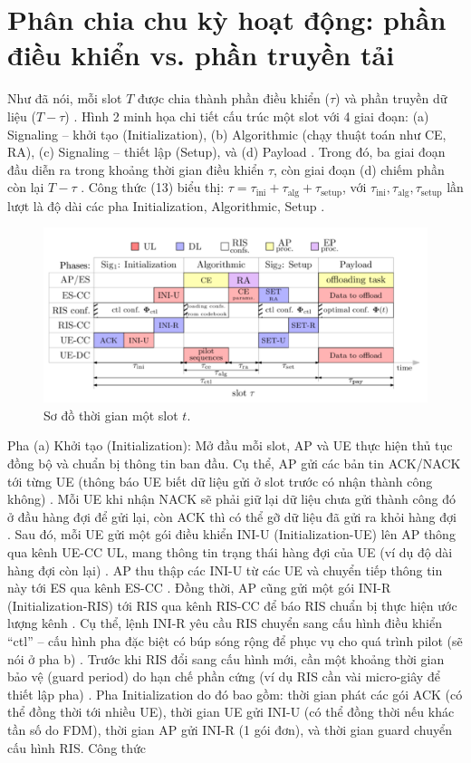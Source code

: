 \section{Phân chia chu kỳ hoạt động: phần điều khiển vs. phần truyền tải}

Như đã nói, mỗi slot $T$ được chia thành phần điều khiển ($\tau$) và phần truyền dữ liệu ($T-\tau$)
. Hình 2 minh họa chi tiết cấu trúc một slot với 4 giai đoạn: (a) Signaling – khởi tạo (Initialization), (b) Algorithmic (chạy thuật toán như CE, RA), (c) Signaling – thiết lập (Setup), và (d) Payload
\cite{ris_latency}
. Trong đó, ba giai đoạn đầu diễn ra trong khoảng thời gian điều khiển $\tau$, còn giai đoạn (d) chiếm phần còn lại $T-\tau$
. Công thức (13) biểu thị: $\tau = \tau_\text{ini} + \tau_\text{alg} + \tau_\text{setup}$, với $\tau_\text{ini}, \tau_\text{alg}, \tau_\text{setup}$ lần lượt là độ dài các pha Initialization, Algorithmic, Setup
.

\begin{figure}[H]
  \centering
  \includegraphics[width=1\textwidth]{images/f2.png}
  \caption{Sơ đồ thời gian một slot $t$. }
    \label{fig:my-image}
\end{figure}


Pha (a) Khởi tạo (Initialization): Mở đầu mỗi slot, AP và UE thực hiện thủ tục đồng bộ và chuẩn bị thông tin ban đầu. Cụ thể, AP gửi các bản tin ACK/NACK tới từng UE (thông báo UE biết dữ liệu gửi ở slot trước có nhận thành công không)
. Mỗi UE khi nhận NACK sẽ phải giữ lại dữ liệu chưa gửi thành công đó ở đầu hàng đợi để gửi lại, còn ACK thì có thể gỡ dữ liệu đã gửi ra khỏi hàng đợi
. Sau đó, mỗi UE gửi một gói điều khiển INI-U (Initialization-UE) lên AP thông qua kênh UE-CC UL, mang thông tin trạng thái hàng đợi của UE (ví dụ độ dài hàng đợi còn lại)
. AP thu thập các INI-U từ các UE và chuyển tiếp thông tin này tới ES qua kênh ES-CC
. Đồng thời, AP cũng gửi một gói INI-R (Initialization-RIS) tới RIS qua kênh RIS-CC để báo RIS chuẩn bị thực hiện ước lượng kênh
\cite{ris_latency}
. Cụ thể, lệnh INI-R yêu cầu RIS chuyển sang cấu hình điều khiển “ctl” – cấu hình pha đặc biệt có búp sóng rộng để phục vụ cho quá trình pilot (sẽ nói ở pha b)
. Trước khi RIS đổi sang cấu hình mới, cần một khoảng thời gian bảo vệ (guard period) do hạn chế phần cứng (ví dụ RIS cần vài micro-giây để thiết lập pha)
. Pha Initialization do đó bao gồm: thời gian phát các gói ACK (có thể đồng thời tới nhiều UE), thời gian UE gửi INI-U (có thể đồng thời nếu khác tần số do FDM), thời gian AP gửi INI-R (1 gói đơn), và thời gian guard chuyển cấu hình RIS. Công thức

